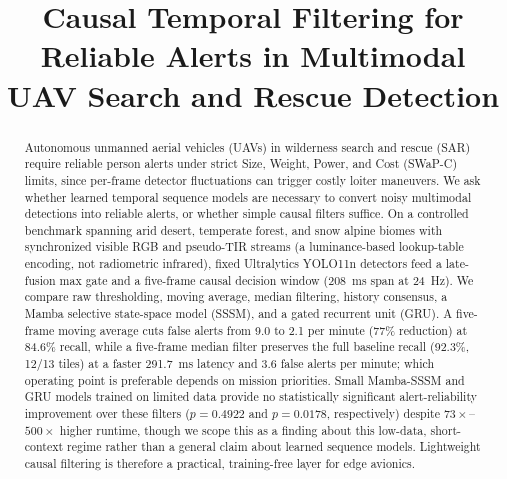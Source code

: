 \documentclass[conference]{IEEEtran}
\begin{document}
\title{Causal Temporal Filtering for Reliable Alerts in Multimodal UAV Search and Rescue Detection}

\author{
}

\maketitle

\begingroup
\renewcommand\thefootnote{}
\endgroup

\begin{abstract}
Autonomous unmanned aerial vehicles (UAVs) in wilderness search and rescue (SAR) require reliable person alerts under strict Size, Weight, Power, and Cost (SWaP-C) limits, since per-frame detector fluctuations can trigger costly loiter maneuvers. We ask whether learned temporal sequence models are necessary to convert noisy multimodal detections into reliable alerts, or whether simple causal filters suffice. On a controlled benchmark spanning arid desert, temperate forest, and snow alpine biomes with synchronized visible RGB and pseudo-TIR streams (a luminance-based lookup-table encoding, not radiometric infrared), fixed Ultralytics YOLO11n detectors feed a late-fusion max gate and a five-frame causal decision window (208~ms span at 24~Hz). We compare raw thresholding, moving average, median filtering, history consensus, a Mamba selective state-space model (SSSM), and a gated recurrent unit (GRU). A five-frame moving average cuts false alerts from 9.0 to 2.1 per minute (77\% reduction) at 84.6\% recall, while a five-frame median filter preserves the full baseline recall (92.3\%, 12/13 tiles) at a faster 291.7~ms latency and 3.6 false alerts per minute; which operating point is preferable depends on mission priorities. Small Mamba-SSSM and GRU models trained on limited data provide no statistically significant alert-reliability improvement over these filters ($p = 0.4922$ and $p = 0.0178$, respectively) despite $73\times$--$500\times$ higher runtime, though we scope this as a finding about this low-data, short-context regime rather than a general claim about learned sequence models. Lightweight causal filtering is therefore a practical, training-free layer for edge avionics.
\end{abstract}
\end{document}
